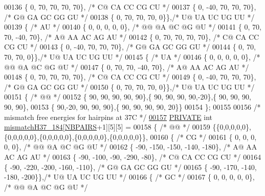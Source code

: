 \begin{DoxyCode}
00136    \{   0,   70,   70,   70,   70\}, \textcolor{comment}{/* C@  CA  CC  CG  CU */}
00137    \{   0,  -40,   70,   70,   70\}, \textcolor{comment}{/* G@  GA  GC  GG  GU */}
00138    \{   0,   70,   70,   70,    0\}\},\textcolor{comment}{/* U@  UA  UC  UG  UU */}
00139   \{ \textcolor{comment}{/* AU */}
00140    \{   0,    0,    0,    0,    0\}, \textcolor{comment}{/* @@  @A  @C  @G  @U */}
00141    \{   0,   70,   70,  -40,   70\}, \textcolor{comment}{/* A@  AA  AC  AG  AU */}
00142    \{   0,   70,   70,   70,   70\}, \textcolor{comment}{/* C@  CA  CC  CG  CU */}
00143    \{   0,  -40,   70,   70,   70\}, \textcolor{comment}{/* G@  GA  GC  GG  GU */}
00144    \{   0,   70,   70,   70,    0\}\},\textcolor{comment}{/* U@  UA  UC  UG  UU */}
00145   \{ \textcolor{comment}{/* UA */}
00146    \{   0,    0,    0,    0,    0\}, \textcolor{comment}{/* @@  @A  @C  @G  @U */}
00147    \{   0,   70,   70,  -40,   70\}, \textcolor{comment}{/* A@  AA  AC  AG  AU */}
00148    \{   0,   70,   70,   70,   70\}, \textcolor{comment}{/* C@  CA  CC  CG  CU */}
00149    \{   0,  -40,   70,   70,   70\}, \textcolor{comment}{/* G@  GA  GC  GG  GU */}
00150    \{   0,   70,   70,   70,    0\}\},\textcolor{comment}{/* U@  UA  UC  UG  UU */}
00151   \{ \textcolor{comment}{/* @@ */}
00152    \{ 90, 90, 90, 90, 90\},\{ 90, 90, 90, 90,-20\},\{ 90, 90, 90, 90, 90\},
00153    \{ 90,-20, 90, 90, 90\},\{ 90, 90, 90, 90, 20\}\}
00154 \};
00155 
00156 \textcolor{comment}{/* mismatch free energies for hairpins at 37C */}
\mbox{\hyperlink{1_88_84__epars_8h_a5f61953c0b965af1d84240529f966099}{00157}} \mbox{\hyperlink{edit__cost_8h_a5e151c615eda34903514212f05a5ccf8}{PRIVATE}} \textcolor{keywordtype}{int} \mbox{\hyperlink{1_88_84__epars_8h_a5f61953c0b965af1d84240529f966099}{mismatchH37\_184}}[\mbox{\hyperlink{1_88_84__epars_8h_a5e75221c779d618eab81e096f37e32ce}{NBPAIRS}}+1][5][5] =
00158 \{ \textcolor{comment}{/* @@ */}
00159   \{\{0,0,0,0,0\},\{0,0,0,0,0\},\{0,0,0,0,0\},\{0,0,0,0,0\},\{0,0,0,0,0\}\},
00160   \{ \textcolor{comment}{/* CG */}
00161    \{   0,    0,    0,    0,    0\}, \textcolor{comment}{/* @@  @A  @C  @G  @U */}
00162    \{ -90, -150, -150, -140, -180\}, \textcolor{comment}{/* A@  AA  AC  AG  AU */}
00163    \{ -90, -100,  -90, -290,  -80\}, \textcolor{comment}{/* C@  CA  CC  CG  CU */}
00164    \{ -90, -220, -200, -160, -110\}, \textcolor{comment}{/* G@  GA  GC  GG  GU */}
00165    \{ -90, -170, -140, -180, -200\}\},\textcolor{comment}{/* U@  UA  UC  UG  UU */}
00166   \{ \textcolor{comment}{/* GC */}
00167    \{   0,    0,    0,    0,    0\}, \textcolor{comment}{/* @@  @A  @C  @G  @U */}

\end{DoxyCode}
